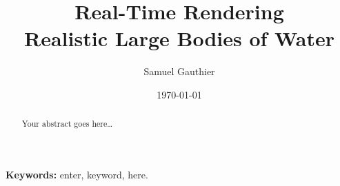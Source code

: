 \title{\textbf{Real-Time Rendering}\\\Large{Realistic Large Bodies of Water}}

\author{\normalsize{Samuel Gauthier}}
\date{\normalsize{\today}}
\maketitle

\begin{abstract}
Your abstract goes here\ldots\\
\end{abstract}

\small{{\bf Keywords:} enter, keyword, here.}
